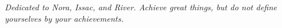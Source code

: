\begin{center}
\emph{Dedicated to Nora, Issac, and River.  Achieve great things, but do not define yourselves by your achievements.}
\end{center}

